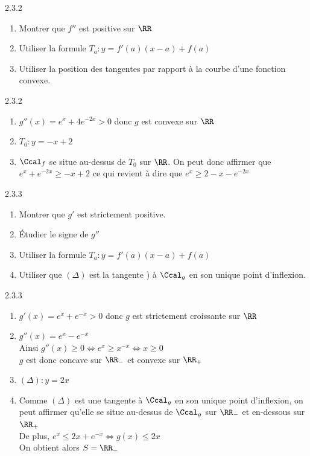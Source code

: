\begin{Indication}{2.3.2}
	\begin{enumerate}
	\item Montrer que $f''$ est positive sur $\RR$
	\item Utiliser la formule $T_a:y=f'(a)(x-a)+f(a)$
	\item Utiliser la position des tangentes par rapport à la courbe d'une fonction convexe.
	\end{enumerate}
\end{Indication}
\begin{Solution}{2.3.2}
	\begin{enumerate}
		\item $g''(x)=e^x+4e^{-2x}>0$ donc $g$ est convexe sur $\RR$
		\item $T_0:y=-x+2$
		\item $\Ccal_f$ se situe au-dessus de $T_0$ sur $\RR$. On peut donc affirmer que $e^x+e^{-2x}\geq-x+2$ ce qui revient à dire que $e^x\geq2-x-e^{-2x}$
	\end{enumerate}
\end{Solution}
\begin{Indication}{2.3.3}
	\begin{enumerate}
		\item Montrer que $g'$ est strictement positive.
		\item Étudier le signe de $g''$
		\item Utiliser la formule $T_a:y=f'(a)(x-a)+f(a)$
		\item Utiliser que $(\Delta)$ est la tangente ) à $\Ccal_g$ en son unique point d'inflexion.
	\end{enumerate}
\end{Indication}
\begin{Solution}{2.3.3}
	\begin{enumerate}
		\item $g'(x)=e^x+e^{-x}>0$ donc $g$ est strictement croissante sur $\RR$
		\item $g''(x)=e^x-e^{-x}$\\
		Ainsi $g''(x)\geq0 \Leftrightarrow e^x\geq x^{-x} \Leftrightarrow x\geq0$\\
		$g$ est donc concave sur $\RR_-$ et convexe sur $\RR_+$
		\item $(\Delta):y=2x$
		\item Comme $(\Delta)$ est une tangente à $\Ccal_g$ en son unique point d'inflexion, on peut affirmer qu'elle se situe au-dessus de $\Ccal_g$ sur $\RR_-$ et en-dessous sur $\RR_+$\\
		De plus, $e^x\leq2x+e^{-x} \Leftrightarrow g(x)\leq2x$\\
		On obtient alors $S=\RR_-$
	\end{enumerate}
\end{Solution}
